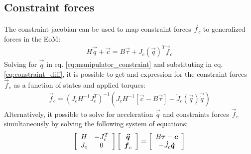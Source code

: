 \subsection{Constraint forces}
\label{sec:constraint_forces}

The constraint jacobian can be used to map constraint forces $\vec{f}_c$ to generalized forces in the EoM:
%
\begin{align}
H \vec{\ddot{q}} + \vec{c} = B \vec{\tau} + J_c( \vec{ q } )^T  \vec{f}_c
\label{eq:manipulator_constraint}
\end{align}
%
Solving for $\vec{\ddot{q}}$ in eq. \eqref{eq:manipulator_constraint} and substituting in eq. \eqref{eq:constraint_diff}, it is possible to get and expression for the constraint forces $\vec{f}_c$ as a function of states and applied torques:
%
\begin{align}
\vec{f}_c = \left( J_c H^{-1} J_c^T \right)^{-1} \left(  J_c H^{-1} [\vec{c} - B \vec{\tau} ] - \dot{J}_c( \vec{ q } ) \vec{\dot{q}}   \right)
\label{eq:const_forces}
\end{align}
%
Alternatively, it possible to solve for acceleration $\vec{\ddot{q}}$ and constraints forces $\vec{f}_c$ simultaneously by solving the following system of equations:
%
\begin{align}
\left[ \begin{array}{c c } 	H & -J_c^T  \\ J_c 	& 0  	\end{array} \right] \left[ \begin{array}{c} \vec{\ddot{q}}  \\ \vec{f}_c \end{array} \right] = \left[ \begin{array}{c}  B \vec{\tau} - \vec{c}   \\ -\dot{J}_c \vec{\dot{q}}  \end{array} \right]
\label{eq:manipulator_constraint_eom}
\end{align}


